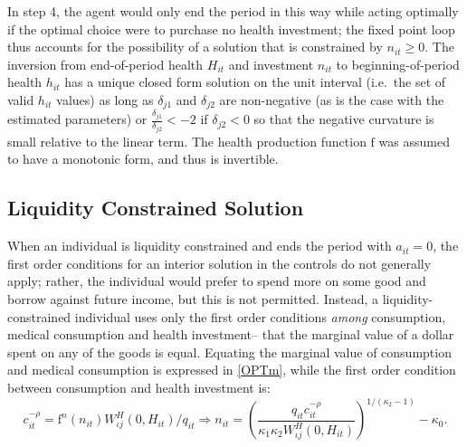 \documentclass[12pt,pdftex,letterpaper]{article}
\newcommand{\Type}{\iota}
\newcommand{\Health}{h}
\newcommand{\PostHealth}{H}
\newcommand{\PostValue}{W}
\newcommand{\Con}{c}
\newcommand{\Invst}{n}
\newcommand{\Assets}{a}
\newcommand{\Copay}{q}
\newcommand{\CRRAcon}{\rho}
\newcommand{\Age}{j}
\newcommand{\HealthParam}{\delta}
\newcommand{\HealthProdFunc}{\text{f}}
\newcommand{\HealthProdParam}{\kappa}
\begin{document}
In step 4, the agent would only end the period in this way while acting optimally if the optimal choice were to purchase no health investment; the fixed point loop thus accounts for the possibility of a solution that is constrained by $\Invst_{it} \geq 0$.  The inversion from end-of-period health $\PostHealth_{it}$ and investment $\Invst_{it}$ to beginning-of-period health $\Health_{it}$ has a unique closed form solution on the unit interval (i.e.\ the set of valid $\Health_{it}$ values) as long as $\HealthParam_{\Age 1}$ and $\HealthParam_{\Age 2}$ are non-negative (as is the case with the estimated parameters) or $\frac{\HealthParam_{\Age 1}}{\HealthParam_{\Age 2}} < -2$ if $\HealthParam_{\Age 2} < 0$ so that the negative curvature is small relative to the linear term.  The health production function $\HealthProdFunc$ was assumed to have a monotonic form, and thus is invertible.


\subsection{Liquidity Constrained Solution}
\label{app:LiqCnstSolution}

When an individual is liquidity constrained and ends the period with $\Assets_{it}=0$, the first order conditions for an interior solution in the controls do not generally apply; rather, the individual would prefer to spend more on some good and borrow against future income, but this is not permitted.  Instead, a liquidity-constrained individual uses only the first order conditions \textit{among} consumption, medical consumption and health investment-- that the marginal value of a dollar spent on any of the goods is equal.  Equating the marginal value of consumption and medical consumption is expressed in \eqref{OPTm}, while the first order condition between consumption and health investment is:
\begin{equation}\label{OPTnCnst}
\Con_{it}^{-\CRRAcon} = \HealthProdFunc^\Invst(\Invst_{it}) \PostValue^\PostHealth_{\Type \Age}(0,\PostHealth_{it})/\Copay_{it} \Longrightarrow \Invst_{it} = \left( \frac{\Copay_{it} \Con_{it}^{-\CRRAcon}}{\HealthProdParam_1 \HealthProdParam_2 \PostValue_{\iota j}^\PostHealth(0,\PostHealth_{it})} \right)^{1/(\HealthProdParam_2 - 1)} - \HealthProdParam_0.
\end{equation}
\end{document}
